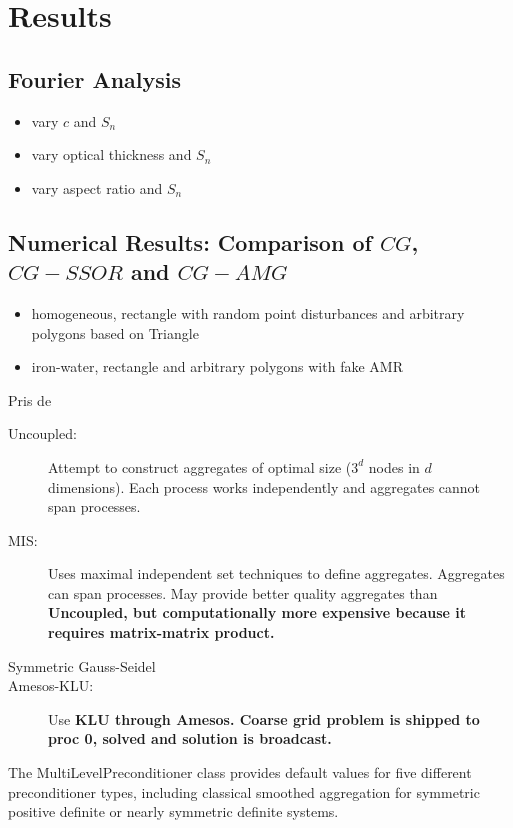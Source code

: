 \section{Results}
\subsection{Fourier Analysis}
\begin{itemize}
\item vary $c$ and $S_n$
\item vary optical thickness and $S_n$
\item vary aspect ratio and $S_n$
\end{itemize}
\subsection{Numerical Results: Comparison of $CG$, $CG-SSOR$ and $CG-AMG$}
\begin{itemize}
\item homogeneous, rectangle with random point disturbances and arbitrary
polygons based on Triangle
\item iron-water, rectangle and arbitrary polygons with fake AMR
\end{itemize}
Pris de \cite{ml-guide}\\
\begin{description}
\item [Uncoupled:] Attempt to construct aggregates of optimal size ($3^d$
nodes in $d$ dimensions). Each process works independently and aggregates
cannot span processes.
\item [MIS:] Uses maximal independent set techniques \cite{mis} to define
aggregates. Aggregates can span processes. May provide better quality
aggregates than \bf{Uncoupled}, but computationally more expensive because it
requires matrix-matrix product.
\item[Symmetric Gauss-Seidel]
\item[Amesos-KLU:] Use \bf{KLU} through \bf{Amesos}. Coarse grid problem is
shipped to proc 0, solved and solution is broadcast.
\end{description}
The MultiLevelPreconditioner class provides default values for five different
preconditioner types, including classical smoothed aggregation for symmetric
positive definite or nearly symmetric definite systems.
